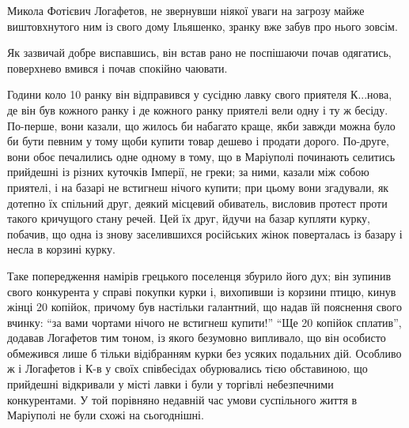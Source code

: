 \documentclass[a4paper,20pt]{report}
\begin{document}
Микола Фотієвич Логафетов, не звернувши ніякої уваги на загрозу майже виштовхнутого ним із свого
дому Ільяшенко, зранку вже забув про нього зовсім.

Як зазвичай добре виспавшись, він встав рано не поспішаючи почав одягатись, поверхнево вмився і
почав спокійно чаювати.


Години коло 10 ранку він відправився у сусідню лавку свого приятеля К...нова,
де він був кожного ранку і де кожного ранку приятелі вели одну і ту ж бесіду.
По-перше, вони казали, що жилось би набагато краще, якби завжди можна було би
бути певним у тому щоби купити товар дешево і продати дорого.  По-друге, вони
обоє печалились одне одному в тому, що в Маріуполі починають селитись прийдешні
із різних куточків Імперії, не греки; за ними, казали між собою приятелі, і на
базарі не встигнеш нічого купити; при цьому вони згадували, як дотепно їх
спільний друг, деякий місцевий обиватель, висловив протест проти такого
кричущого стану речей. Цей їх друг, йдучи на базар купляти курку, побачив, що
одна із знову заселившихся російських жінок поверталась із базару і несла в
корзині курку.

Таке попередження намірів грецького поселенця збурило його дух; він зупинив
свого конкурента у справі покупки курки і, вихопивши із корзини птицю, кинув
жінці 20 копійок, причому був настільки галантний, що надав їй пояснення свого
вчинку: ``за вами чортами нічого не встигнеш купити!'' ``Ще 20 копійок
сплатив'', додавав Логафетов тим тоном, із якого безумовно випливало, що він
особисто обмежився лише б тільки відібранням курки без усяких подальних дій.
Особливо ж і Логафетов і К-в у своїх співбесідах обурювались тією обставиною,
що прийдешні відкривали у місті лавки і були у торгівлі небезпечними
конкурентами. У той порівняно недавній час умови суспільного життя в Маріуполі
не були схожі на сьогоднішні.

\end{document}
